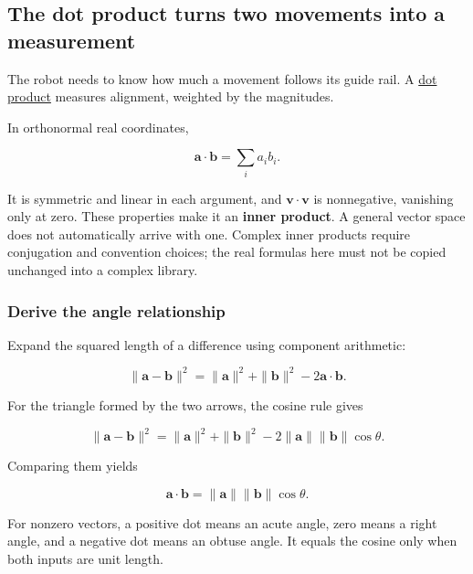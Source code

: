 \subsection{The dot product turns two movements into a measurement}\label{01-foundations-i-ch017-the-dot-product-turns-two-movements-into-a-measurement}

\hypertarget{01-foundations-i-ch017-the-dot-product-turns-two-movements-into-a-measurement}{}

The robot needs to know how much a movement follows its guide rail. A \hyperref[01-foundations-i-ch017-the-dot-product-turns-two-movements-into-a-measurement]{dot product} measures alignment, weighted by the magnitudes.

In orthonormal real coordinates,

\[
\mathbf a\cdot\mathbf b=\sum_i a_i b_i.
\]

It is symmetric and linear in each argument, and \(\mathbf v\cdot\mathbf v\) is nonnegative, vanishing only at zero. These properties make it an \textbf{inner product}. A general vector space does not automatically arrive with one. Complex inner products require conjugation and convention choices; the real formulas here must not be copied unchanged into a complex library.

\subsubsection{Derive the angle relationship}\label{01-foundations-i-ch017-derive-the-angle-relationship}

\hypertarget{01-foundations-i-ch017-derive-the-angle-relationship}{}

Expand the squared length of a difference using component arithmetic:

\[
\|\mathbf a-\mathbf b\|^2
=\|\mathbf a\|^2+\|\mathbf b\|^2-2\mathbf a\cdot\mathbf b.
\]

For the triangle formed by the two arrows, the cosine rule gives

\[
\|\mathbf a-\mathbf b\|^2
=\|\mathbf a\|^2+\|\mathbf b\|^2
-2\|\mathbf a\|\|\mathbf b\|\cos\theta.
\]

Comparing them yields

\[
\mathbf a\cdot\mathbf b=\|\mathbf a\|\|\mathbf b\|\cos\theta.
\]

For nonzero vectors, a positive dot means an acute angle, zero means a right angle, and a negative dot means an obtuse angle. It equals the cosine only when both inputs are unit length.


